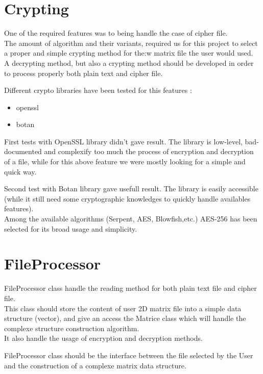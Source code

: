 \section{Crypting}

One of the required features was to being handle the case of cipher file.\\
The amount of algorithm and their variants, required us for this project to select a proper and simple crypting method for the:w matrix file the user would used.\\
A decrypting method, but also a crypting method should be developed in order to process properly both plain text and cipher file.

\par
Different crypto libraries have been tested for this features :
\begin{itemize}
	\item openssl
	\item botan
\end{itemize}

\par
First tests with OpenSSL library didn't gave result. The library is low-level, bad-documented and complexify too much the process of encryption and decryption of a file, while for this above feature we were mostly looking for a simple and quick way.

\par
Second test with Botan library gave usefull result. The library is easily accessible (while it still need some cryptographic knowledges to quickly handle availables features).\\
Among the available algorithms (Serpent, AES, Blowfish,etc.) AES-256 has been selected for its broad usage and simplicity.


\section{FileProcessor}

FileProcessor class handle the reading method for both plain text file and cipher file.\\
This class should store the content of user 2D matrix file into a simple data structure (vector), and
give an access the Matrice class which will handle the complexe structure construction algorithm.\\
It also handle the usage of encryption and decryption methods.

\par
FileProcessor class should be the interface between the file selected by the User and the construction of a complexe
matrix data structure.